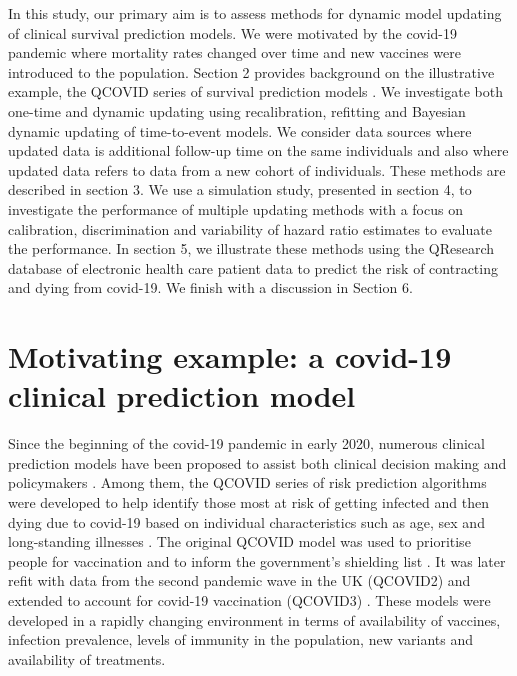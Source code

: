 \documentclass[]{article}
\begin{document}
In this study, our primary aim is to assess methods for dynamic model updating of clinical survival prediction models. We were motivated by the covid-19 pandemic where mortality rates changed over time and new vaccines were introduced to the population. Section 2 provides background on the illustrative example, the QCOVID series of survival prediction models  \citep{Clift2020, Hippisley-Cox2021}. We investigate both one-time and dynamic updating using recalibration, refitting and Bayesian dynamic updating of time-to-event models. We consider data sources where updated data is additional follow-up time on the same individuals and also where updated data refers to data from a new cohort of individuals. These methods are described in section 3. We use a simulation study, presented in section 4, to investigate the performance of multiple updating methods with a focus on calibration, discrimination and variability of hazard ratio estimates to evaluate the performance. In section 5, we illustrate these methods using the QResearch database of electronic health care patient data \citep{QResearch2022} to predict the risk of contracting and dying from covid-19.  We finish with a discussion in Section 6.





\section{Motivating example: a covid-19 clinical prediction model}

Since the beginning of the covid-19 pandemic in early 2020, numerous clinical prediction models have been proposed to assist both clinical decision making and policymakers \citep{Wynants2020}. Among them, the QCOVID series of risk prediction algorithms were developed to help identify those most at risk of getting infected and then dying due to covid-19 based on individual characteristics such as age, sex and long-standing illnesses \citep{Clift2020, Hippisley-Cox2021}. The original QCOVID model was used to prioritise people for vaccination and to inform the government’s shielding list \citep{Clift2020}. It was later refit with data from the second pandemic wave in the UK (QCOVID2) and extended to account for covid-19 vaccination (QCOVID3) \citep{Hippisley-Cox2021}. These models were developed in a rapidly changing environment in terms of availability of vaccines, infection prevalence, levels of immunity in the population, new variants and availability of treatments.
\end{document}
